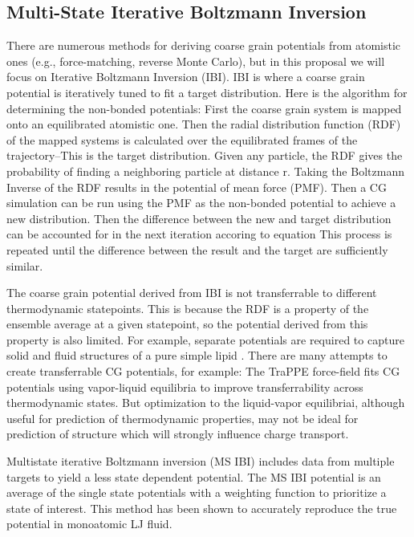 
\subsection*{Multi-State Iterative Boltzmann Inversion}

There are numerous methods for deriving coarse grain potentials from atomistic ones (e.g., force-matching, reverse Monte Carlo), but in this proposal we will focus on Iterative Boltzmann Inversion (IBI).
IBI is where a coarse grain potential is iteratively tuned to fit a target distribution\cite{Reith2003}.
Here is the algorithm for determining the non-bonded potentials:
First the coarse grain system is mapped onto an equilibrated atomistic one.
Then the radial distribution function (RDF) of the mapped systems is calculated over the equilibrated frames of the trajectory--This is the target distribution.
Given any particle, the RDF gives the probability of finding a neighboring particle at distance r.
Taking the Boltzmann Inverse of the RDF results in the potential of mean force (PMF). %
Then a CG simulation can be run using the PMF as the non-bonded potential to achieve a new distribution.
Then the difference between the new and target distribution can be accounted for in the next iteration accoring to equation %
This process is repeated until the difference between the result and the target are sufficiently similar.

The coarse grain potential derived from IBI is not transferrable to different thermodynamic statepoints.
This is because the RDF is a property of the ensemble average at a given statepoint, so the potential derived from this property is also limited.
For example, separate potentials are required to capture solid and fluid structures of a pure simple lipid \cite{Hadley2010a}.
There are many attempts to create transferrable CG potentials, for example:
The TraPPE force-field fits CG potentials using vapor-liquid equilibria to improve transferrability across thermodynamic states\cite{Maerzke2011}.
But optimization to the liquid-vapor equilibriai, although useful for prediction of thermodynamic properties, may not be ideal for prediction of structure which will strongly influence charge transport.

Multistate iterative Boltzmann inversion (MS IBI) includes data from multiple targets to yield a less state dependent potential\cite{Moore2014}.
The MS IBI potential is an average of the single state potentials with a weighting function to prioritize a state of interest.
This method has been shown to accurately reproduce the true potential in monoatomic LJ fluid.

